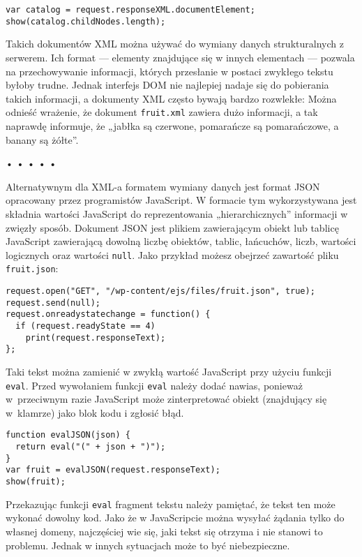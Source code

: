   
\begin{verbatim} 
var catalog = request.responseXML.documentElement;
show(catalog.childNodes.length);
 \end{verbatim}
  
Takich dokumentów XML można używać do wymiany danych strukturalnych z serwerem. Ich format — elementy znajdujące się w innych elementach — pozwala na przechowywanie informacji, których przesłanie w postaci zwykłego tekstu byłoby trudne. Jednak interfejs DOM nie najlepiej nadaje się do pobierania takich informacji, a dokumenty XML często bywają bardzo rozwlekłe: Można odnieść wrażenie, że dokument \texttt{fruit.xml} zawiera dużo informacji, a tak naprawdę informuje, że „jabłka są czerwone, pomarańcze są pomarańczowe, a banany są żółte”.


\begin{center}
• • • • •
\end{center}

  
Alternatywnym dla XML-a formatem wymiany danych jest format JSON opracowany przez programistów JavaScript. W formacie tym wykorzystywana jest składnia wartości JavaScript do reprezentowania „hierarchicznych” informacji w zwięzły sposób. Dokument JSON jest plikiem zawierającym obiekt lub tablicę JavaScript zawierającą dowolną liczbę obiektów, tablic, łańcuchów, liczb, wartości logicznych oraz wartości \texttt{null}. Jako przykład możesz obejrzeć zawartość pliku \texttt{fruit.json}:

  
\begin{verbatim} 
request.open("GET", "/wp-content/ejs/files/fruit.json", true);
request.send(null);
request.onreadystatechange = function() {
  if (request.readyState == 4)
    print(request.responseText);
};
 \end{verbatim}
  
Taki tekst można zamienić w zwykłą wartość JavaScript przy użyciu funkcji \texttt{eval}. Przed wywołaniem funkcji \texttt{eval} należy dodać nawias, ponieważ w~przeciwnym razie JavaScript może zinterpretować obiekt (znajdujący się w~klamrze) jako blok kodu i zgłosić błąd.

  
\begin{verbatim} 
function evalJSON(json) {
  return eval("(" + json + ")");
}
var fruit = evalJSON(request.responseText);
show(fruit);
 \end{verbatim}
  
Przekazując funkcji \texttt{eval} fragment tekstu należy pamiętać, że tekst ten może wykonać dowolny kod. Jako że w JavaScripcie można wysyłać żądania tylko do własnej domeny, najczęściej wie się, jaki tekst się otrzyma i nie stanowi to problemu. Jednak w innych sytuacjach może to być niebezpieczne.



